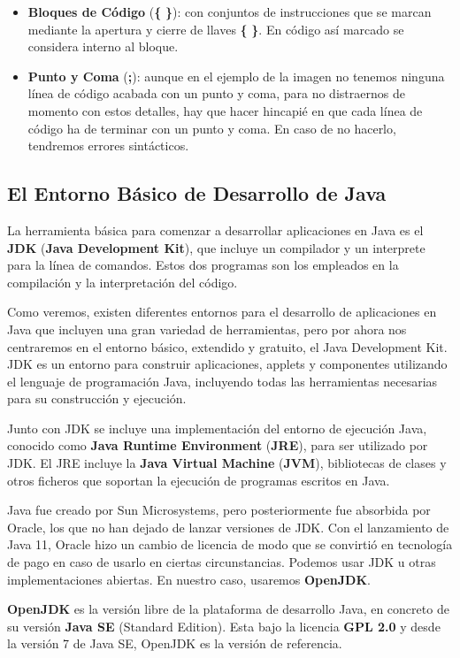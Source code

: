 \begin{itemize}
    \item \textbf{Bloques de Código} (\textbf{\{} \textbf{\}}): con conjuntos de instrucciones que se marcan mediante la apertura y cierre de llaves \textbf{\{} \textbf{\}}. En código así marcado se considera interno al bloque.

    \item \textbf{Punto y Coma} (\textbf{;}): aunque en el ejemplo de la imagen no tenemos ninguna línea de código acabada con un punto y coma, para no distraernos de momento con estos detalles, hay que hacer hincapié en que cada línea de código ha de terminar con un punto y coma. En caso de no hacerlo, tendremos errores sintácticos.
\end{itemize}

\subsection{El Entorno Básico de Desarrollo de Java}
La herramienta básica para comenzar a desarrollar aplicaciones en Java es el \textbf{JDK} (\textbf{Java Development Kit}), que incluye un compilador y un interprete para la línea de comandos. Estos dos programas son los empleados en la compilación y la interpretación del código.

Como veremos, existen diferentes entornos para el desarrollo de aplicaciones en Java que incluyen una gran variedad de herramientas, pero por ahora nos centraremos en el entorno básico, extendido y gratuito, el Java Development Kit. JDK es un entorno para construir aplicaciones, applets y componentes utilizando el lenguaje de programación Java, incluyendo todas las herramientas necesarias para su construcción y ejecución.

Junto con JDK se incluye una implementación del entorno de ejecución Java, conocido como \textbf{Java Runtime Environment} (\textbf{JRE}), para ser utilizado por JDK. El JRE incluye la \textbf{Java Virtual Machine} (\textbf{JVM}), bibliotecas de clases y otros ficheros que soportan la ejecución de programas escritos en Java.

Java fue creado por Sun Microsystems, pero posteriormente fue absorbida por Oracle, los que no han dejado de lanzar versiones de JDK. Con el lanzamiento de Java 11, Oracle hizo un cambio de licencia de modo que se convirtió en tecnología de pago en caso de usarlo en ciertas circunstancias. Podemos usar JDK u otras implementaciones abiertas. En nuestro caso, usaremos \textbf{OpenJDK}.

\textbf{OpenJDK} es la versión libre de la plataforma de desarrollo Java, en concreto de su versión \textbf{Java SE} (Standard Edition). Esta bajo la licencia \textbf{GPL 2.0} y desde la versión 7 de Java SE, OpenJDK es la versión de referencia. \cite{wiki01}

